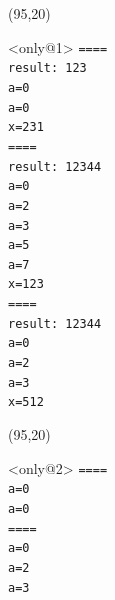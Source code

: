 \documentclass{beamer}
\begin{document}
\begin{frame}[fragile,t]
\begin{minipage}{0.75\textwidth}
    \end{minipage}
    \begin{textblock}{25}(95,20)
     \vspace{-0.5cm}
    \begin{block}<only@1>{\vspace*{-3ex}}
    \scriptsize
    \verb;====            ;\\
    \verb;result: 123     ;\\
    \verb;a=0             ;\\
    \verb;a=0             ;\\
    \verb;x=231           ;\\
    \verb;====            ;\\
    \verb;result: 12344   ;\\
    \verb;a=0             ;\\
    \verb;a=2             ;\\
    \verb;a=3             ;\\
    \verb;a=5             ;\\
    \verb;a=7             ;\\
    \verb;x=123           ;\\
    \verb;====            ;\\
    \verb;result: 12344   ;\\
    \verb;a=0             ;\\
    \verb;a=2             ;\\
    \verb;a=3             ;\\
    \verb;x=512           ;\\
    \vspace*{0.5ex}
    \end{block}
    \end{textblock}
    \begin{textblock}{25}(95,20)
     \vspace{-0.5cm}
    \begin{block}<only@2>{\vspace*{-3ex}}
    \scriptsize
    \verb;====            ;\\
    \verb;a=0             ;\\
    \verb;a=0             ;\\
    \verb;====            ;\\
    \verb;a=0             ;\\
    \verb;a=2             ;\\
    \verb;a=3             ;\\

\end{block}
\end{textblock}
\end{frame}
\end{document}
